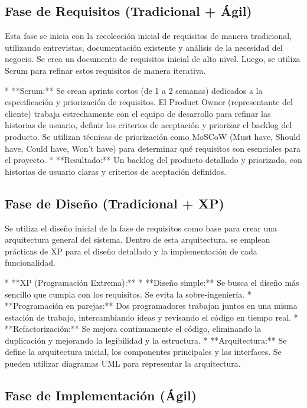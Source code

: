 \documentclass[12pt, spanish]{article}
\begin{document}
\subsection*{Fase de Requisitos (Tradicional + Ágil)}

Esta fase se inicia con la recolección inicial de requisitos de manera tradicional, utilizando entrevistas, documentación existente y análisis de la necesidad del negocio.  Se crea un documento de requisitos inicial de alto nivel.  Luego, se utiliza Scrum para refinar estos requisitos de manera iterativa.

*   **Scrum:** Se crean sprints cortos (de 1 a 2 semanas) dedicados a la especificación y priorización de requisitos.  El Product Owner (representante del cliente) trabaja estrechamente con el equipo de desarrollo para refinar las historias de usuario, definir los criterios de aceptación y priorizar el backlog del producto. Se utilizan técnicas de priorización como MoSCoW (Must have, Should have, Could have, Won't have) para determinar qué requisitos son esenciales para el proyecto.
*   **Resultado:** Un backlog del producto detallado y priorizado, con historias de usuario claras y criterios de aceptación definidos.

\subsection*{Fase de Diseño (Tradicional + XP)}

Se utiliza el diseño inicial de la fase de requisitos como base para crear una arquitectura general del sistema.  Dentro de esta arquitectura, se emplean prácticas de XP para el diseño detallado y la implementación de cada funcionalidad.

*   **XP (Programación Extrema):**
    *   **Diseño simple:** Se busca el diseño más sencillo que cumpla con los requisitos.  Se evita la sobre-ingeniería.
    *   **Programación en parejas:** Dos programadores trabajan juntos en una misma estación de trabajo, intercambiando ideas y revisando el código en tiempo real.
    *   **Refactorización:**  Se mejora continuamente el código, eliminando la duplicación y mejorando la legibilidad y la estructura.
*   **Arquitectura:** Se define la arquitectura inicial, los componentes principales y las interfaces.  Se pueden utilizar diagramas UML para representar la arquitectura.

\subsection*{Fase de Implementación (Ágil)}
\end{document}
